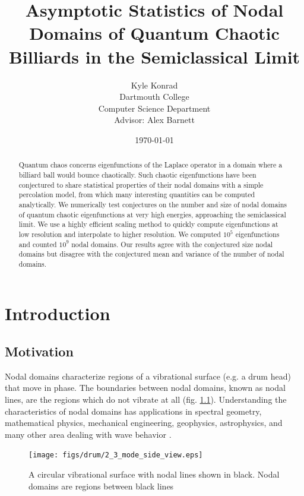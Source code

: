 \documentclass{report}
\begin{document}
\title{Asymptotic Statistics of Nodal Domains of Quantum Chaotic Billiards in the Semiclassical Limit}
\author{Kyle Konrad\\
  Dartmouth College\\
  Computer Science Department\\
  Advisor: Alex Barnett}
\date{\today}

\maketitle

\begin{abstract}
  Quantum chaos concerns eigenfunctions of the Laplace operator in a domain where a billiard ball would bounce chaotically.
Such chaotic eigenfunctions have been conjectured to share statistical properties of their nodal domains with a simple percolation model, from which many interesting quantities can be computed analytically. We numerically test conjectures on the number and size of nodal domains of quantum chaotic eigenfunctions at very high energies, approaching the semiclassical limit. We use a highly efficient scaling method to quickly compute eigenfunctions at low resolution and interpolate to higher resolution. We computed $10^{5}$ eigenfunctions and counted $10^{9}$ nodal domains. Our results agree with the conjectured size nodal domains but disagree with the conjectured mean and variance of the number of nodal domains.
\end{abstract}

\chapter{Introduction}
\label{chap:intro}
\section{Motivation}
\label{sec:motivation}
Nodal domains characterize regions of a vibrational surface (e.g. a drum head) that move in phase. The boundaries between nodal domains, known as nodal lines, are the regions which do not vibrate at all (fig. \ref{fig:drum}). Understanding the characteristics of nodal domains has applications in spectral geometry, mathematical physics, mechanical engineering, geophysics, astrophysics, and many other area dealing with wave behavior \cite{wigman}.

\begin{figure}
  \begin{center}
    \texttt{[image: figs/drum/2\_3\_mode\_side\_view.eps]}
    \caption{A circular vibrational surface with nodal lines shown in black. Nodal domains are regions between black lines}
    \label{fig:drum}
  \end{center}
\end{figure}
\end{document}
